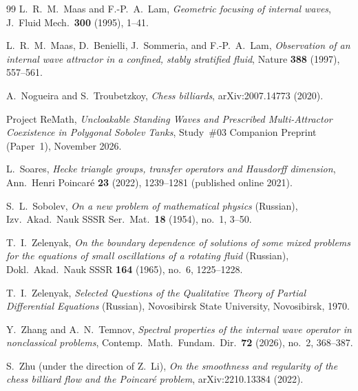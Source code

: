 \documentclass[11pt,reqno]{amsart}
\theoremstyle{definition}
\theoremstyle{remark}
\begin{document}
\begin{thebibliography}{99}
L.~R.~M.~Maas and F.-P.~A.~Lam,
\emph{Geometric focusing of internal waves},
J.\ Fluid Mech.\ \textbf{300} (1995), 1--41.

L.~R.~M.~Maas, D.~Benielli, J.~Sommeria, and F.-P.~A.~Lam,
\emph{Observation of an internal wave attractor in a confined, stably stratified fluid},
Nature \textbf{388} (1997), 557--561.

A.~Nogueira and S.~Troubetzkoy,
\emph{Chess billiards},
arXiv:2007.14773 (2020).

Project ReMath,
\emph{Uncloakable Standing Waves and Prescribed Multi-Attractor Coexistence in Polygonal Sobolev Tanks},
Study~\#03 Companion Preprint (Paper~1), November 2026.

L.~Soares,
\emph{Hecke triangle groups, transfer operators and Hausdorff dimension},
Ann.\ Henri Poincar\'e \textbf{23} (2022), 1239--1281 (published online 2021).

S.~L.~Sobolev,
\emph{On a new problem of mathematical physics} (Russian),
Izv.\ Akad.\ Nauk SSSR Ser.\ Mat.\ \textbf{18} (1954), no.~1, 3--50.

T.~I.~Zelenyak,
\emph{On the boundary dependence of solutions of some mixed problems for the equations of small oscillations of a rotating fluid} (Russian),
Dokl.\ Akad.\ Nauk SSSR \textbf{164} (1965), no.~6, 1225--1228.

T.~I.~Zelenyak,
\emph{Selected Questions of the Qualitative Theory of Partial Differential Equations} (Russian),
Novosibirsk State University, Novosibirsk, 1970.

Y.~Zhang and A.~N.~Temnov,
\emph{Spectral properties of the internal wave operator in nonclassical problems},
Contemp.\ Math.\ Fundam.\ Dir.\ \textbf{72} (2026), no.~2, 368--387.

S.~Zhu (under the direction of Z.~Li),
\emph{On the smoothness and regularity of the chess billiard flow and the Poincar\'e problem},
arXiv:2210.13384 (2022).

\end{thebibliography}
\end{document}
